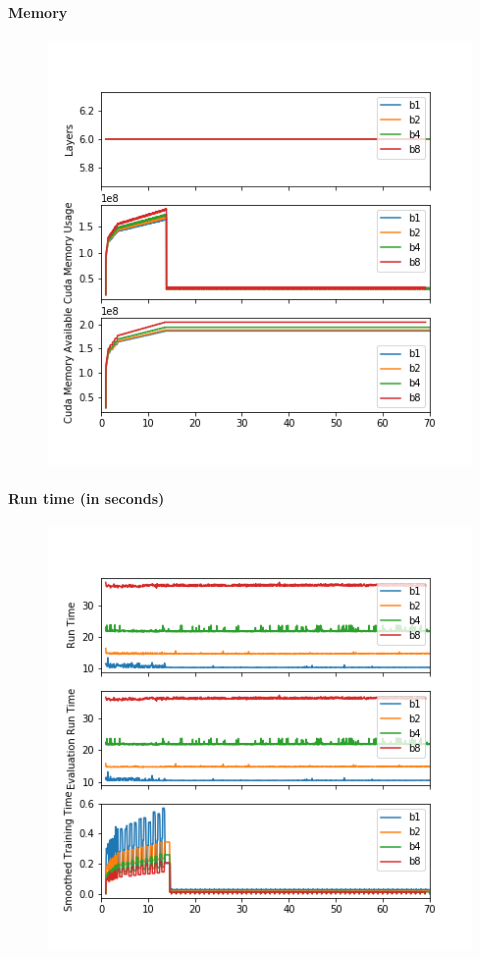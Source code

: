 \paragraph{Memory}

\begin{figure}[H]
\includegraphics[width=.8\textwidth]{parts/appendix/reports-gmsnn/docs_esteban-latex/test_reports/2018-06-19/b1a8_memory.png}
\end{figure}

\paragraph{Run time (in seconds)}

\begin{figure}[H]
\includegraphics[width=.8\textwidth]{parts/appendix/reports-gmsnn/docs_esteban-latex/test_reports/2018-06-19/b1a8_time.png}
\end{figure}

